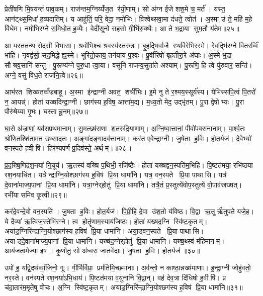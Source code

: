 प्रेती॑षणि मि॒षय॑न्तं पाव॒कम्। राज॑न्तम॒ग्निय्यँ॑ज॒त र॑यी॒णाम्। सो अ॑ग्न ईजे शश॒मे च॒ मर्त॑। यस्त॒ आन॑ट्थ्स॒मिधा॑ ह॒व्यदा॑तिम्। य आहु॑तिं॒ परि॒ वेदा॒ नमो॑भिः। विश्वेथ्सवा॒मा द॑धते॒ त्वोत॑। अ॒स्मा उ॑ ते॒ महि॑ म॒हे वि॑धेम। नमो॑भिरग्ने स॒मिधो॒त ह॒व्यैः। वेदी॑सूनो सहसो गी॒र्भिरु॒क्थैः। आ ते भ॒द्राया सुम॒तौ य॑तेम॥२५॥

आ॒ यस्त॒तन्थ॒ रोद॑सी॒ विभा॒सा। श्रवो॑भिश्च श्रव॒स्य॑स्तरु॑त्रः। बृ॒हद्भि॒र्वाजै॒ स्थवि॑रेभिर॒स्मे। रे॒वद्भि॑रग्ने वित॒रव्विँ भा॑हि। नृ॒वद्व॑सो॒ सद॒मिद्धेह्य॒स्मे। भूरि॑तो॒काय॒ तन॑याय प॒श्वः। पू॒र्वीरिषो॑ बृह॒तीरा॒रे अ॑घाः। अ॒स्मे भ॒द्रा सौश्रव॒सानि॑ सन्तु। पु॒रूण्य॑ग्ने पुरु॒धा त्वा॒या। वसू॑नि राजन्व॒सुता॑ते अश्याम्। पु॒रूणि॒ हि त्वे पु॑रुवार॒ सन्ति॑। अग्ने॒ वसु॑ विध॒ते राज॑नि॒त्वे॥२६॥\anuvakamend[जा॒गृ॒वासो॒ अनु॑ग्म॒न्मानु॑षाणाञ्चर्‌षणी॒नाय्यँ॑तेमाश्या॒न्द्वे च॑]

आभ॑रत शिख्षतव्वँज्रबाहू। अ॒स्मा इ॑न्द्राग्नी अवत॒ शची॑भिः। इ॒मे नु ते र॒श्मय॒स्सूर्य॑स्य। येभि॑स्सपि॒त्वं पि॒तरो॑ न॒ आयन्न्॑। होता॑ यख्षदिन्द्रा॒ग्नी। छाग॑स्य ह॒विष॒ आत्ता॑म॒द्य। म॒ध्य॒तो मेद॒ उद्भृ॑तम्। पु॒रा द्वेषोभ्यः। पु॒रा पौरु॑षेय्या गृ॒भः। घस्तान्नू॒नम्॥२७॥

घा॒से अ॑ज्राणां॒ यव॑सप्रथमानाम्। सु॒मत्ख्ष॑राणा श॒तरु॑द्रियाणाम्। अ॒ग्नि॒ष्वा॒त्तानां॒ पीवो॑पवसनानाम्। पा॒र्श्व॒तः श्रो॑णि॒तश्शि॑ताम॒त उ॑थ्साद॒तः। अङ्गा॑दङ्गा॒दव॑त्तानाम्। कर॑त ए॒वेन्द्रा॒ग्नी। जु॒षेता ह॒विः। होत॒र्यज॑। दे॒वेभ्यो॑ वनस्पते ह॒वीषि॑। हिर॑ण्यपर्ण प्र॒दिव॑स्ते॒ अर्थम्।॥२८॥

प्र॒द॒ख्षि॒णिद्र॑श॒नया॑ नि॒यूय॑। ऋ॒तस्य॑ वख्षि प॒थिभी॒ रजि॑ष्ठैः। होता॑ यख्षद्वन॒स्पति॑म॒भिहि। पि॒ष्टत॑मया॒ रभि॑ष्ठया रश॒नयाधि॑त। यत्रेन्द्राग्नि॒योश्छाग॑स्य ह॒विष॑ प्रि॒या धामा॑नि। यत्र॒ वन॒स्पते प्रि॒या पाथासि। यत्र॑ दे॒वाना॑माज्य॒पानां प्रि॒या धामा॑नि। यत्रा॒ग्नेर्‌होतु॑ प्रि॒या धामा॑नि। तत्रै॒तं प्र॒स्तुत्ये॑वोप॒स्तुत्ये॑ वो॒पाव॑स्रख्षत्। रभी॑यासमिव कृ॒त्वी॥२९॥

कर॑दे॒वन्दे॒वो वन॒स्पति॑। जु॒षता ह॒विः। होत॒र्यज॑। पि॒प्री॒हि दे॒वा उ॑श॒तो य॑विष्ठ। वि॒द्वा ऋ॒तूर्\mbox{}ऋ॑तुपते यजे॒ह। ये दैव्या॑ ऋ॒त्विज॒स्तेभि॑रग्ने। त्व होतॄ॑णाम॒स्याय॑जिष्ठः। होता॑ यख्षद॒ग्नि स्वि॑ष्ट॒कृतम्। अया॑ड॒ग्निरि॑न्द्राग्नि॒योश्छाग॑स्य ह॒विष॑ प्रि॒या धामा॑नि। अया॒ड्वन॒स्पते प्रि॒या पाथासि। अयाड्दे॒वाना॑माज्य॒पानां प्रि॒या धामा॑नि। यख्ष॑द॒ग्नेर्‌होतु॑ प्रि॒या धामा॑नि। यख्ष॒थ्स्वं म॑हि॒मानम्। आय॑जता॒मेज्या॒ इष॑। कृ॒णोतु॒ सो अ॑ध्व॒रा जा॒तवे॑दाः। जु॒षता ह॒विः। होत॒र्यज॑ ॥३०॥\anuvakamend[नू॒नमर्थ॑ङ्कृ॒त्वी पाथासि स॒प्त च॑]

उपो॑ ह॒ यद्वि॒दथ॑व्वाँ॒जिनो॒ गूः। गी॒र्भिर्विप्रा॒ प्रम॑तिमि॒च्छमा॑नाः। अ॒र्वन्तो॒ न काष्ठा॒न्नख्ष॑माणाः। इ॒न्द्रा॒ग्नी जोहु॑वतो॒ नर॒स्ते। वन॑स्पते रश॒नया॑ऽभि॒धाय॑। पि॒ष्टत॑मया व॒युना॑नि वि॒द्वान्। वह॑ देव॒त्रा दि॑धिषो ह॒वीषि॑। प्र च॑दा॒तार॑म॒मृते॑षु वोचः। अ॒ग्नि स्वि॑ष्ट॒कृतम्। अया॑ड॒ग्निरि॑न्द्राग्नि॒योश्छग॑स्य ह॒विष॑ प्रि॒या धामा॑नि॥३१॥

